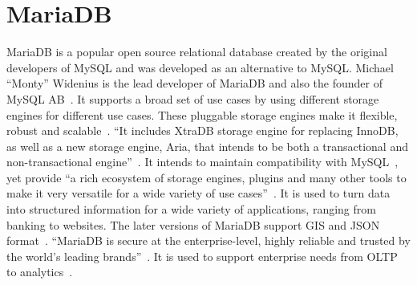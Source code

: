 \section{MariaDB}
 
MariaDB is a popular open source relational database created by the original
developers of MySQL and was developed as an alternative to MySQL. Michael
``Monty'' Widenius is the lead developer of MariaDB and also the founder of
MySQL AB~\cite{hid-sp18-516-wiki-mariadb}. It supports a broad set of use cases
by using different storage engines for different use cases. These pluggable
storage engines make it flexible, robust and
scalable~\cite{hid-sp18-516-mariadb-server}. ``It includes XtraDB storage engine
for replacing InnoDB, as well as a new storage engine, Aria, that intends to be
both a transactional and non-transactional
engine''~\cite{hid-sp18-516-wiki-mariadb}. It intends to maintain compatibility
with MySQL~\cite{hid-sp18-516-wiki-mariadb}, yet provide ``a rich ecosystem of
storage engines, plugins and many other tools to make it very versatile for a
wide variety of use cases''~\cite{hid-sp18-516-mariadb-foundation}. It is used
to turn data into structured information for a wide variety of applications,
ranging from banking to websites. The later versions of MariaDB support GIS and
JSON format~\cite{hid-sp18-516-mariadb-foundation}. ``MariaDB is secure at the
enterprise-level, highly reliable and trusted by the world's leading
brands''~\cite{hid-sp18-516-mariadb}. It is used to support enterprise needs
from OLTP to analytics~\cite{hid-sp18-516-mariadb}.
 

